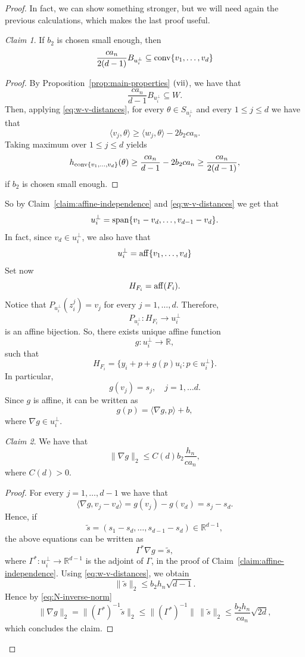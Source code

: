 \documentclass[10pt]{amsart}
\newcommand{\1}{\textbf{1}}
\newcommand{\conv}{{\rm conv}}
\numberwithin{equation}{section} %
\theoremstyle{remark}
\newtheorem{claim}{Claim}
\theoremstyle{definition}
\begin{document}
\begin{proof}
In fact, we can show something stronger, but we will need again the previous calculations, which makes the last proof useful.

     \begin{claim}\label{claim:ball-inside-v}
     If $b_2$ is chosen small enough, then \[\frac{ca_n}{2(d-1)} B_{u_i^\perp} \subseteq\conv\{v_1,\ldots,v_d\}\]     
     \end{claim}

     \begin{proof}
         By Proposition~\ref{prop:main-properties} ${\rm (vii)}$, we have that \[ \frac{ca_n}{d-1} B_{u_i^\perp} \subseteq W.\] Then, applying \eqref{eq:w-v-distances}, for every $\theta \in S_{u_i^\perp}$ and every $1 \leq j \leq d$ we have that 
         \[\langle v_j,\theta\rangle \geq \langle w_j,\theta\rangle-2b_2ca_n.\] Taking maximum over $1 \leq j \leq d$ yields \[h_{\conv\{v_1,\ldots,v_d\}}(\theta) \geq \frac{ca_n}{d-1}-2b_2ca_n \geq \frac{ca_n}{2(d-1)},\] if $b_2$ is chosen small enough.
     \end{proof}


     
     So by Claim~\ref{claim:affine-independence} and \eqref{eq:w-v-distances} we get that \[u_i^\perp ={\rm span}\{v_1-v_d,\ldots,v_{d-1}-v_d\}.\] In fact, since $v_d \in u_i^\perp$, we also have that \[u_i^\perp={\rm aff}\{v_1,\ldots,v_d\}\] Set now \[H_{F_i}={\rm aff}(F_i).\] Notice that $P_{u_i^\perp}(z_i^j)=v_j$ for every $j=1,\ldots,d$. Therefore, \[P_{u_i^\perp}:H_{F_i} \to u_i^\perp \] is an affine bijection. So, there exists unique affine function \[g: u_i^\perp \to \mathbb{R},\] such that \begin{equation}\label{eq:HF-writing}    
     H_{F_i}=\{y_i+p+g(p)u_i: p \in u_i^\perp\}.
     \end{equation}In particular, \[g(v_j)=s_j, \quad j=1,\ldots d.\] Since $g$ is affine, it can be written as \[g(p)=\langle \nabla g,p \rangle+b,\] where $\nabla g \in u_i^\perp$.


     
     \begin{claim}\label{claim:nabla-upper-bound}
         We have that \[\|\nabla g \|_2 \leq C(d)b_2 \frac{h_n}{ca_n},\] where $C(d)>0$.
     \end{claim}

     \begin{proof}
         For every $j=1,\ldots,d-1$ we have that \[\langle \nabla g, v_j-v_d\rangle=g(v_j)-g(v_d)=s_j-s_d.\] Hence, if \[\tilde{s}=(s_1-s_d,\ldots,s_{d-1}-s_d) \in \mathbb{R}^{d-1},\] the above equations can be written as \[\Gamma^\ast \nabla g=\tilde{s},\] where $\Gamma^\ast: u_i^\perp \to \mathbb{R}^{d-1}$ is the adjoint of $\Gamma$, in the proof of Claim~\ref{claim:affine-independence}. Using \eqref{eq:w-v-distances}, we obtain \[\|\tilde{s}\|_2 \leq b_2h_n\sqrt{d-1}.\] Hence by \eqref{eq:N-inverse-norm} \[\|\nabla g\|_2 =\|(\Gamma^\ast)^{-1}\tilde{s}\|_2 \leq \|(\Gamma^\ast)^{-1}\| \,\|\tilde{s}\|_2 \leq \frac{b_2h_n}{ca_n}\sqrt{2d}, \] which concludes the claim.
     \end{proof}


\end{proof}
\end{document}
